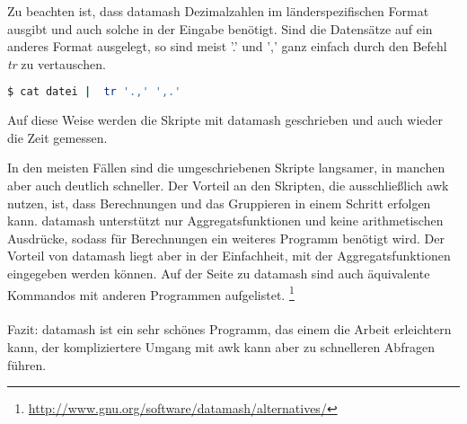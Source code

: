 Zu beachten ist, dass datamash Dezimalzahlen im länderspezifischen Format ausgibt und auch solche in der Eingabe benötigt. Sind die Datensätze auf ein anderes Format ausgelegt, so sind meist '.' und ',' ganz einfach durch den Befehl \textit{tr} zu vertauschen.
\begin{lstlisting}[language=Bash]
$ cat datei |  tr '.,' ',.'
\end{lstlisting}

Auf diese Weise werden die Skripte mit datamash geschrieben und auch wieder die Zeit gemessen.


In den meisten Fällen sind die umgeschriebenen Skripte langsamer, in manchen aber auch deutlich schneller. Der Vorteil an den Skripten, die ausschließlich awk nutzen, ist, dass Berechnungen und das Gruppieren in einem Schritt erfolgen kann. datamash unterstützt nur Aggregatsfunktionen und keine arithmetischen Ausdrücke, sodass für Berechnungen ein weiteres Programm benötigt wird. Der Vorteil von datamash liegt aber in der Einfachheit, mit der Aggregatsfunktionen eingegeben werden können.
Auf der Seite zu datamash sind auch äquivalente Kommandos mit anderen Programmen aufgelistet.
\footnote{\url{http://www.gnu.org/software/datamash/alternatives/}}\\\\
Fazit: datamash ist ein sehr schönes Programm, das einem die Arbeit erleichtern kann, der kompliziertere Umgang mit awk kann aber zu schnelleren Abfragen führen.

